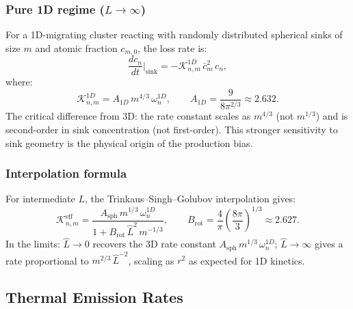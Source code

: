 \documentclass[pdflatex,sn-basic]{sn-jnl} %
\begin{document}
\subsubsection{Pure 1D regime ($L \to \infty$)}

For a 1D-migrating cluster reacting with randomly distributed spherical sinks
of size $m$ and atomic fraction $c_{m,0}$, the loss rate is:
\begin{equation}\label{eq:1D_loss}
    \frac{dc_n}{dt}\bigg|_{\text{sink}}
    = -\mathcal{K}_{n,m}^{1D}\,\bar{c}_m^2\,c_n,
\end{equation}
where:
\begin{equation}\label{eq:K1D}
    \mathcal{K}_{n,m}^{1D}
    = A_{1D}\,m^{4/3}\,\omega_n^{1D},
    \qquad A_{1D} = \frac{9}{8\pi^{2/3}} \approx 2.632.
\end{equation}
The critical difference from 3D: the rate constant scales as $m^{4/3}$ (not
$m^{1/3}$) and is second-order in sink concentration (not first-order). This
stronger sensitivity to sink geometry is the physical origin of the production
bias.

\subsubsection{Interpolation formula}

For intermediate $L$, the Trinkaus--Singh--Golubov interpolation gives:
\begin{equation}\label{eq:K_interp}
    \mathcal{K}_{n,m}^{\mathrm{eff}}
    = \frac{A_{\mathrm{sph}}\,m^{1/3}\,\omega_n^{1D}}
           {1 + B_{\mathrm{rot}}\,\hat{L}^2\,m^{-1/3}},
    \qquad B_{\mathrm{rot}}
    = \frac{4}{\pi}\left(\frac{8\pi}{3}\right)^{1/3}
    \approx 2.627.
\end{equation}
In the limits: $\hat{L} \to 0$ recovers the 3D rate constant
$A_{\mathrm{sph}}\,m^{1/3}\,\omega_n^{1D}$; $\hat{L} \to \infty$ gives a
rate proportional to $m^{2/3}\,\hat{L}^{-2}$, scaling as $r^2$ as expected
for 1D kinetics.

\subsection{Thermal Emission Rates}
\label{sec:emission_rates}
\end{document}
